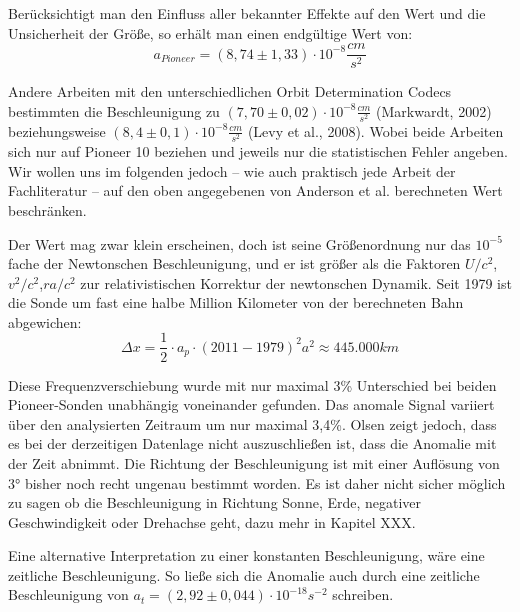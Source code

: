 Berücksichtigt man den Einfluss aller bekannter Effekte auf den Wert und die Unsicherheit der Größe\cite{Turyshev2004}, so erhält man einen endgültige Wert von:  
\begin{equation}
  a_{Pioneer} = (8,74\pm1,33)\cdot10^{-8}\frac{cm}{s^2}
\end{equation}

Andere Arbeiten mit den  unterschiedlichen Orbit Determination Codecs bestimmten die Beschleunigung zu $(7,70
\pm0,02)\cdot10^{-8}\frac{cm}{s^2}$ (Markwardt, 2002)\cite{Markwardt2002} beziehungsweise %
$(8,4\pm0,1)\cdot10^{-8}\frac{cm}{s^2}$ (Levy et al., 2008)\cite{Levy2008}.
Wobei beide Arbeiten sich nur auf Pioneer 10 beziehen und jeweils nur die statistischen Fehler angeben.
Wir wollen uns im folgenden jedoch – wie auch praktisch jede Arbeit der Fachliteratur – auf den oben angegebenen von
Anderson et al. berechneten Wert beschränken.

Der Wert mag zwar klein erscheinen, doch ist seine Größenordnung nur das $10^{-5}$ fache der Newtonschen Beschleunigung,
und er ist größer als die Faktoren $U/c^2$,$v^2/c^2$,$r a/c^2$ zur relativistischen Korrektur der newtonschen Dynamik.
Seit 1979 ist die Sonde um fast eine halbe Million Kilometer von der berechneten Bahn abgewichen:
\begin{equation}
  \Delta x= \frac12 \cdot a_p \cdot (2011-1979)^2 a^2\approx 445.000 km
\end{equation}

Diese Frequenzverschiebung wurde mit nur maximal 3\% Unterschied bei beiden Pioneer-Sonden unabhängig voneinander
gefunden. Das anomale Signal variiert über den analysierten Zeitraum um nur maximal 3,4\%\cite{Turyshev2004}.
Olsen zeigt jedoch, dass es bei der derzeitigen Datenlage nicht auszuschließen ist, dass die Anomalie mit der Zeit abnimmt.\cite{Olsen2006}
Die Richtung der
Beschleunigung ist mit einer Auflösung von 3° bisher noch recht ungenau bestimmt worden. Es ist daher nicht sicher möglich
zu sagen ob die Beschleunigung
in Richtung Sonne, Erde, negativer Geschwindigkeit oder Drehachse geht, dazu mehr in Kapitel XXX.

Eine alternative Interpretation zu einer konstanten Beschleunigung, wäre eine zeitliche Beschleunigung.
So ließe sich die Anomalie auch durch eine zeitliche Beschleunigung von $a_t = (2,92 \pm 0,044) \cdot 10^{-18} s^{-2}$ schreiben.

